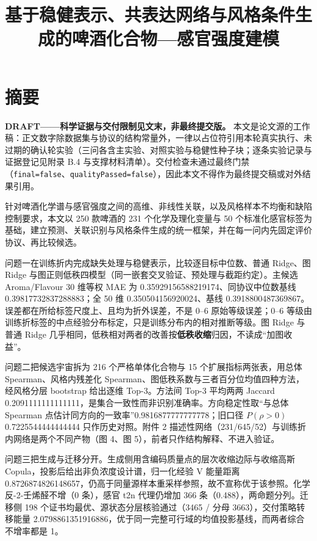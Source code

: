 \documentclass[11pt,a4paper]{article}
\title{基于稳健表示、共表达网络与风格条件生成的啤酒化合物---感官强度建模}
\author{}
\date{}
\newenvironment{draftbanner}{%
  \par\medskip\noindent
  \setlength{\fboxsep}{5pt}\setlength{\fboxrule}{0.4pt}%
  \begin{lrbox}{\bpDraftBox}%
  \begin{minipage}{\dimexpr\linewidth-2\fboxsep-2\fboxrule\relax}%
  \small\setlength{\parindent}{0pt}\setlength{\parskip}{0pt}%
  \raggedright
}{%
  \end{minipage}%
  \end{lrbox}%
  \noindent\fcolorbox{black!45}{yellow!8}{\usebox{\bpDraftBox}}%
  \par\medskip
}
\begin{document}
\maketitle
\thispagestyle{empty}
\section*{摘要}\label{ux6458ux8981}

\begin{draftbanner}
\textbf{DRAFT——科学证据与交付限制见文末，非最终提交版。} 本文是论文源的工作稿：正文数字除数据集与协议的结构常量外，一律以占位符引用本轮真实执行、未过期的确认轮实验（三问各含主实验、对照实验与稳健性种子块；逐条实验记录与证据登记见附录 B.4 与支撑材料清单）。交付检查未通过最终门禁（\texttt{final=false}、\texttt{qualityPassed=false}），因此本文不得作为最终提交稿或对外结果引用。
\end{draftbanner}

针对啤酒化学谱与感官强度之间的高维、非线性关联，以及风格样本不均衡和缺陷控制要求，本文以
250 款啤酒的 231 个化学及理化变量与 50
个标准化感官标签为基础，建立预测、关联识别与风格条件生成的统一框架，并在每一问内先固定评价协议、再比较候选。

问题一在训练折内完成缺失处理与稳健表示，比较逐目标中位数、普通 Ridge、图
Ridge 与图正则低秩四模型（同一嵌套交叉验证、预处理与截距约定）。主候选
Aroma/Flavour 30 维等权 MAE 为 0.35929156588219174、同协议中位数基线
0.39817732837288883；全 50 维 0.350504156920024、基线
0.3918800487369867。误差都在所给标签尺度上、且均为折外误差，不是 0--6
原始等级误差；0--6
等级由训练折标签的中点经验分布标定，只是训练分布内的相对推断等级。图
Ridge 与普通 Ridge
几乎相同，低秩相对两者的改善按\textbf{低秩收缩}归因，不读成``加图收益''。

问题二把候选宇宙拆为 216 个严格单体化合物与 15 个扩展指标两张表，用总体
Spearman、风格内残差化
Spearman、图低秩系数与三者百分位均值四种方法，经风格分层 bootstrap
给出逐维 Top-3。方法间 Top-3 平均两两 Jaccard
0.2091111111111111，是集合一致性而非识别准确率。方向稳定性取``与总体
Spearman 点估计同方向的一致率''0.9816877777777778；旧口径 \(P(\rho>0)\)
0.7225544444444444 只作历史对照。附件 2
描述性网络（231/645/52）与训练折内网络是两个不同产物（图 4、图
5），前者只作结构解释、不进入验证。

问题三把生成与迁移分开。生成侧用含编码质量点的层次收缩边际与收缩高斯
Copula，投影后给出非负浓度设计谱，归一化经验 V 能量距离
0.8726874826148657，仍高于同量源样本重采样参照，故不宣称优于该参照。化学反-2-壬烯醛不增（0
条），感官 t2n 代理仍增加 366 条（0.488），两命题分列。迁移侧 198
个证书均最优、源状态分层核验通过（3465 / 分母 3663），交付策略转移能量
2.0798861351916886，优于同一完整可行域的均值投影基线，而两者综合不增率都是
1。
\end{document}
